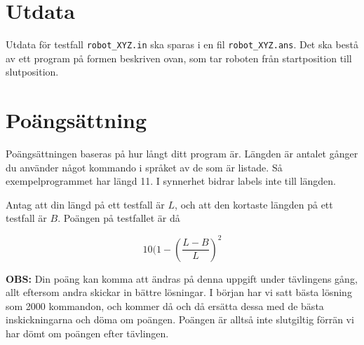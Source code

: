 \section*{Utdata}
Utdata för testfall \texttt{robot\_XYZ.in} ska sparas i en fil \texttt{robot\_XYZ.ans}. Det ska bestå av ett program på formen beskriven ovan, som tar roboten från startposition till slutposition.

\section*{Poängsättning}
Poängsättningen baseras på hur långt ditt program är. Längden är antalet gånger du använder något kommando i språket av de som är listade. Så exempelprogrammet har längd 11. I synnerhet bidrar labels inte till längden.

Antag att din längd på ett testfall är $L$, och att den kortaste längden på ett testfall är $B$. Poängen på testfallet är då

\[ 10 (1 - (\frac{L - B}{L})^2\]

\textbf{OBS:} Din poäng kan komma att ändras på denna uppgift under tävlingens gång, allt eftersom andra skickar in bättre lösningar. I början har vi satt bästa lösning som 2000 kommandon, och kommer då och då ersätta dessa
med de bästa inskickningarna och döma om poängen. Poängen är alltså inte slutgiltig förrän vi har dömt om poängen efter tävlingen.
